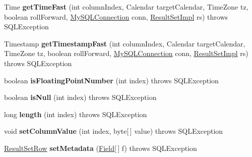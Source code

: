 \begin{DoxyCompactItemize}
\item 
\mbox{\label{classcom_1_1mysql_1_1jdbc_1_1_buffer_row_ab35226bf069aac27262110f02ee1adf9}} 
Time {\bfseries get\+Time\+Fast} (int column\+Index, Calendar target\+Calendar, Time\+Zone tz, boolean roll\+Forward, \mbox{\hyperlink{interfacecom_1_1mysql_1_1jdbc_1_1_my_s_q_l_connection}{My\+S\+Q\+L\+Connection}} conn, \mbox{\hyperlink{classcom_1_1mysql_1_1jdbc_1_1_result_set_impl}{Result\+Set\+Impl}} rs)  throws S\+Q\+L\+Exception 
\item 
\mbox{\label{classcom_1_1mysql_1_1jdbc_1_1_buffer_row_a92b1616c9064bca92188be1ad0d4c9de}} 
Timestamp {\bfseries get\+Timestamp\+Fast} (int column\+Index, Calendar target\+Calendar, Time\+Zone tz, boolean roll\+Forward, \mbox{\hyperlink{interfacecom_1_1mysql_1_1jdbc_1_1_my_s_q_l_connection}{My\+S\+Q\+L\+Connection}} conn, \mbox{\hyperlink{classcom_1_1mysql_1_1jdbc_1_1_result_set_impl}{Result\+Set\+Impl}} rs)  throws S\+Q\+L\+Exception 
\item 
\mbox{\label{classcom_1_1mysql_1_1jdbc_1_1_buffer_row_abfb8a51661b4bfb8efd5ad783b969aa2}} 
boolean {\bfseries is\+Floating\+Point\+Number} (int index)  throws S\+Q\+L\+Exception 
\item 
\mbox{\label{classcom_1_1mysql_1_1jdbc_1_1_buffer_row_a06546e7698baa4d5d8afc03fba3a66fd}} 
boolean {\bfseries is\+Null} (int index)  throws S\+Q\+L\+Exception 
\item 
\mbox{\label{classcom_1_1mysql_1_1jdbc_1_1_buffer_row_a4d3f439b464359c6ffa543390c06254a}} 
long {\bfseries length} (int index)  throws S\+Q\+L\+Exception 
\item 
\mbox{\label{classcom_1_1mysql_1_1jdbc_1_1_buffer_row_aec309feb8e5ff10fbd19f12b6d38ffdb}} 
void {\bfseries set\+Column\+Value} (int index, byte\mbox{[}$\,$\mbox{]} value)  throws S\+Q\+L\+Exception 
\item 
\mbox{\label{classcom_1_1mysql_1_1jdbc_1_1_buffer_row_a245f44766c75f6711cf5f5358d9ff1d9}} 
\mbox{\hyperlink{classcom_1_1mysql_1_1jdbc_1_1_result_set_row}{Result\+Set\+Row}} {\bfseries set\+Metadata} (\mbox{\hyperlink{classcom_1_1mysql_1_1jdbc_1_1_field}{Field}}\mbox{[}$\,$\mbox{]} f)  throws S\+Q\+L\+Exception 

\end{DoxyCompactItemize}
